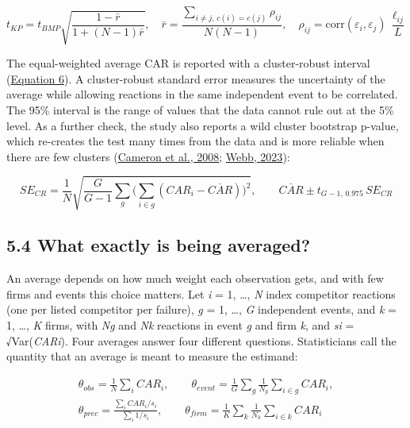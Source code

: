\documentclass[12pt,a4paper]{article}
\begin{document}
\hypertarget{eq-5}{}\begin{equation}
t_{KP} = t_{BMP}\sqrt{\frac{1-\bar r}{1+(N-1)\bar r}}, \quad \bar r = \frac{\sum_{i\neq j,\,c(i)=c(j)} \rho_{ij}}{N(N-1)}, \quad \rho_{ij} = \mathrm{corr}(\varepsilon_i,\varepsilon_j)\,\frac{\ell_{ij}}{L}
\end{equation}

The equal-weighted average CAR is reported with a cluster-robust interval (\hyperlink{eq-6}{Equation 6}). A cluster-robust standard error measures the uncertainty of the average while allowing reactions in the same independent event to be correlated. The 95\% interval is the range of values that the data cannot rule out at the 5\% level. As a further check, the study also reports a wild cluster bootstrap p-value, which re-creates the test many times from the data and is more reliable when there are few clusters (\hyperlink{ref-cameron2008}{Cameron et al., 2008}; \hyperlink{ref-webb2023}{Webb, 2023}):

\hypertarget{eq-6}{}\begin{equation}
SE_{CR} = \frac{1}{N}\sqrt{\frac{G}{G-1}\sum_g\Big(\sum_{i\in g}(CAR_i-\overline{CAR})\Big)^2}, \qquad \overline{CAR} \pm t_{G-1,\,0.975}\,SE_{CR}
\end{equation}

\subsection*{5.4 What exactly is being averaged?}
An average depends on how much weight each observation gets, and with few firms and events this choice matters. Let \emph{i} = 1, …, \emph{N} index competitor reactions (one per listed competitor per failure), \emph{g} = 1, …, \emph{G} independent events, and \emph{k} = 1, …, \emph{K} firms, with \emph{N}\emph{g} and \emph{N}\emph{k} reactions in event \emph{g} and firm \emph{k}, and \emph{s}\emph{i} = √Var(\emph{CAR}\emph{i}). Four averages answer four different questions. Statisticians call the quantity that an average is meant to measure the estimand:

\hypertarget{eq-7}{}\begin{equation}
\begin{gathered}\theta_{obs} = \frac{1}{N}\sum_i CAR_i,\qquad \theta_{event} = \frac{1}{G}\sum_g \frac{1}{N_g}\sum_{i\in g} CAR_i,\\ \theta_{prec} = \frac{\sum_i CAR_i/s_i}{\sum_i 1/s_i},\qquad \theta_{firm} = \frac{1}{K}\sum_k \frac{1}{N_k}\sum_{i\in k} CAR_i\end{gathered}
\end{equation}
\end{document}
